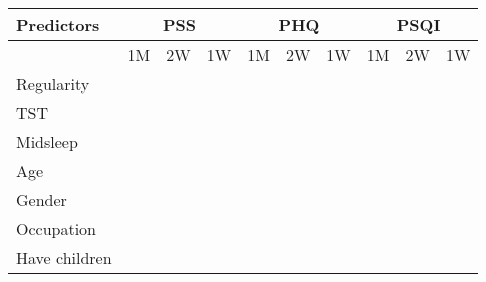 \begin{table}[!htbp]
\begin{tabular}{@{}llllllllll@{}}
\toprule
Predictors            & \multicolumn{3}{c}{\textbf{PSS}}  & \multicolumn{3}{c}{\textbf{PHQ}}  & \multicolumn{3}{c}{\textbf{PSQI}} \\ \midrule
\multicolumn{1}{l|}{} & 1M & 2W & \multicolumn{1}{l|}{1W} & 1M & 2W & \multicolumn{1}{l|}{1W} & 1M & 2W & \multicolumn{1}{l|}{1W} \\ \midrule
Regularity            &    &    &                         &    &    &                         &    &    &                         \\
TST                   &    &    &                         &    &    &                         &    &    &                         \\
Midsleep              &    &    &                         &    &    &                         &    &    &                         \\
Age                   &    &    &                         &    &    &                         &    &    &                         \\
Gender                &    &    &                         &    &    &                         &    &    &                         \\
Occupation            &    &    &                         &    &    &                         &    &    &                         \\
Have children         &    &    &                         &    &    &                         &    &    &                         \\ \bottomrule
\end{tabular}
\end{table}